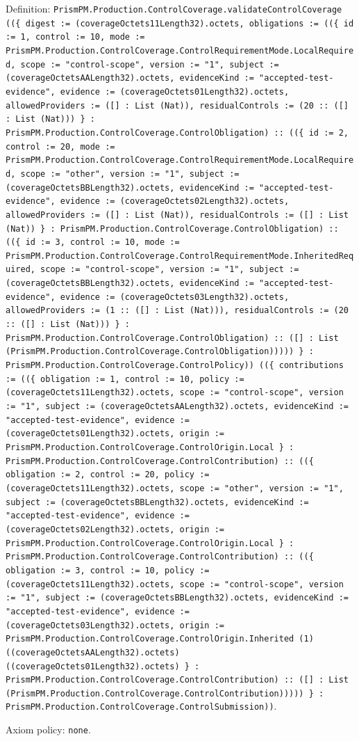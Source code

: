 \documentclass[11pt]{article}
\begin{document}
\noindent Definition: \texttt{PrismPM.Production.ControlCoverage.validateControlCoverage ((\{ digest := (coverageOctets11Length32).octets, obligations := ((\{ id := 1, control := 10, mode := PrismPM.Production.ControlCoverage.ControlRequirementMode.LocalRequired, scope := "control-scope", version := "1", subject := (coverageOctetsAALength32).octets, evidenceKind := "accepted-test-evidence", evidence := (coverageOctets01Length32).octets, allowedProviders := ([] : List (Nat)), residualControls := (20 :: ([] : List (Nat))) \} : PrismPM.Production.ControlCoverage.ControlObligation) :: ((\{ id := 2, control := 20, mode := PrismPM.Production.ControlCoverage.ControlRequirementMode.LocalRequired, scope := "other", version := "1", subject := (coverageOctetsBBLength32).octets, evidenceKind := "accepted-test-evidence", evidence := (coverageOctets02Length32).octets, allowedProviders := ([] : List (Nat)), residualControls := ([] : List (Nat)) \} : PrismPM.Production.ControlCoverage.ControlObligation) :: ((\{ id := 3, control := 10, mode := PrismPM.Production.ControlCoverage.ControlRequirementMode.InheritedRequired, scope := "control-scope", version := "1", subject := (coverageOctetsBBLength32).octets, evidenceKind := "accepted-test-evidence", evidence := (coverageOctets03Length32).octets, allowedProviders := (1 :: ([] : List (Nat))), residualControls := (20 :: ([] : List (Nat))) \} : PrismPM.Production.ControlCoverage.ControlObligation) :: ([] : List (PrismPM.Production.ControlCoverage.ControlObligation))))) \} : PrismPM.Production.ControlCoverage.ControlPolicy)) ((\{ contributions := ((\{ obligation := 1, control := 10, policy := (coverageOctets11Length32).octets, scope := "control-scope", version := "1", subject := (coverageOctetsAALength32).octets, evidenceKind := "accepted-test-evidence", evidence := (coverageOctets01Length32).octets, origin := PrismPM.Production.ControlCoverage.ControlOrigin.Local \} : PrismPM.Production.ControlCoverage.ControlContribution) :: ((\{ obligation := 2, control := 20, policy := (coverageOctets11Length32).octets, scope := "other", version := "1", subject := (coverageOctetsBBLength32).octets, evidenceKind := "accepted-test-evidence", evidence := (coverageOctets02Length32).octets, origin := PrismPM.Production.ControlCoverage.ControlOrigin.Local \} : PrismPM.Production.ControlCoverage.ControlContribution) :: ((\{ obligation := 3, control := 10, policy := (coverageOctets11Length32).octets, scope := "control-scope", version := "1", subject := (coverageOctetsBBLength32).octets, evidenceKind := "accepted-test-evidence", evidence := (coverageOctets03Length32).octets, origin := PrismPM.Production.ControlCoverage.ControlOrigin.Inherited (1) ((coverageOctetsAALength32).octets) ((coverageOctets01Length32).octets) \} : PrismPM.Production.ControlCoverage.ControlContribution) :: ([] : List (PrismPM.Production.ControlCoverage.ControlContribution))))) \} : PrismPM.Production.ControlCoverage.ControlSubmission))}.\par
\noindent Axiom policy: \texttt{none}.\par
\end{document}
